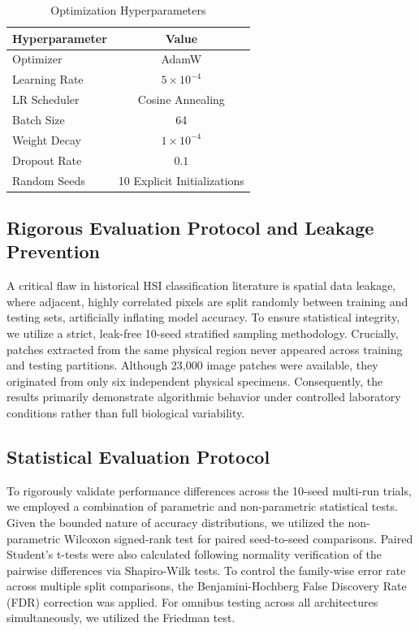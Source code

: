 \documentclass[pdflatex,sn-mathphys-num,iicol]{sn-jnl}
\begin{document}
\begin{table}[h]
\centering
\caption{Optimization Hyperparameters}\label{tab:hyperparams}
\begin{tabular}{lc}
\toprule
\textbf{Hyperparameter} & \textbf{Value} \\
\midrule
Optimizer & AdamW \\
Learning Rate & $5 \times 10^{-4}$ \\
LR Scheduler & Cosine Annealing \\
Batch Size & 64 \\
Weight Decay & $1 \times 10^{-4}$ \\
Dropout Rate & $0.1$ \\
Random Seeds & 10 Explicit Initializations \\
\bottomrule
\end{tabular}
\end{table}

\subsection{Rigorous Evaluation Protocol and Leakage Prevention}
A critical flaw in historical HSI classification literature is spatial data leakage, where adjacent, highly correlated pixels are split randomly between training and testing sets, artificially inflating model accuracy. To ensure statistical integrity, we utilize a strict, leak-free 10-seed stratified sampling methodology. Crucially, patches extracted from the same physical region never appeared across training and testing partitions. Although 23,000 image patches were available, they originated from only six independent physical specimens. Consequently, the results primarily demonstrate algorithmic behavior under controlled laboratory conditions rather than full biological variability.

\subsection{Statistical Evaluation Protocol}
To rigorously validate performance differences across the 10-seed multi-run trials, we employed a combination of parametric and non-parametric statistical tests. Given the bounded nature of accuracy distributions, we utilized the non-parametric Wilcoxon signed-rank test for paired seed-to-seed comparisons. Paired Student's t-tests were also calculated following normality verification of the pairwise differences via Shapiro-Wilk tests. To control the family-wise error rate across multiple split comparisons, the Benjamini-Hochberg False Discovery Rate (FDR) correction was applied. For omnibus testing across all architectures simultaneously, we utilized the Friedman test. 
\end{document}

